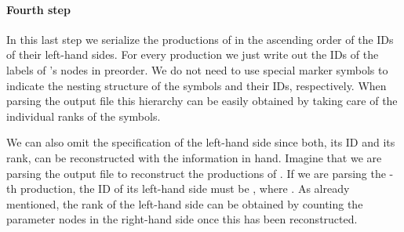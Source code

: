 \documentclass[12pt]{llncs}
\begin{document}
\paragraph*{Fourth step} In this last step we serialize the productions of  in the ascending order of the IDs of their left-hand sides. For every production  we just write out the IDs of the labels of 's nodes in preorder. We do not need to use special marker symbols to indicate the nesting structure of the symbols and their IDs, respectively. When parsing the output file this hierarchy can be easily obtained by taking care of the individual ranks of the symbols.

We can also omit the specification of the left-hand side  since both, its ID and its rank, can be reconstructed with the information in hand. Imagine that we are parsing the output file to reconstruct the productions of . If we are parsing the -th production, the ID of its left-hand side must be , where . As already mentioned, the rank of the left-hand side can be obtained by counting the parameter nodes in the right-hand side once this has been reconstructed.
\end{document}
